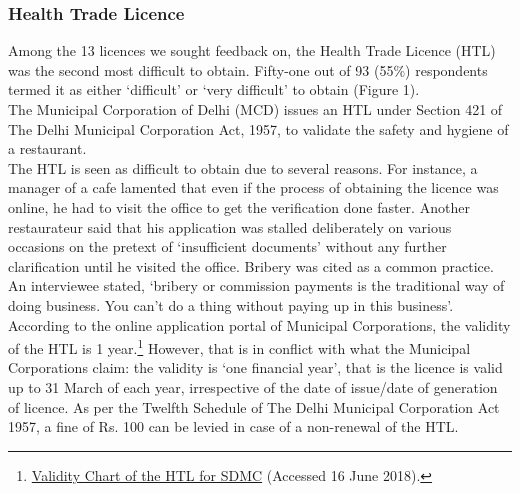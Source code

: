\documentclass[a4paper, 12pt]{article}
\begin{document}
                          
                                         
                    \subsubsection{Health Trade Licence}
                    Among the 13 licences we sought feedback on, the Health Trade Licence (HTL) was the second most difficult to obtain. Fifty-one out of 93 (55\%) respondents termed it as either ‘difficult’ or ‘very difficult’ to obtain (Figure 1). \\
                    The Municipal Corporation of Delhi (MCD) issues an HTL under Section 421 of The Delhi Municipal Corporation Act, 1957, to validate the safety and hygiene of a restaurant.\\
                    The HTL is seen as difficult to obtain due to several reasons. For instance, a manager of a cafe lamented that even if the process of obtaining the licence was online, he had to visit the office to get the verification done faster. Another restaurateur said that his application was stalled deliberately on various occasions on the pretext of ‘insufficient documents’ without any further clarification until he visited the office. Bribery was cited as a common practice. An interviewee stated, ‘bribery or commission payments is the traditional way of doing business. You can’t do a thing without paying up in this business’.\\
                    According to the online application portal of Municipal Corporations, the validity of the HTL is 1 year.\footnote{\href{https://bit.ly/2Qzd92r}{Validity Chart of the HTL for SDMC} (Accessed 16 June 2018).}  %
                    However, that is in conflict with what the Municipal Corporations claim: the validity is ‘one financial year’, that is the licence is valid up to 31 March of each year, irrespective of the date of issue/date of generation of licence. As per the Twelfth Schedule of The Delhi Municipal Corporation Act 1957, a fine of Rs. 100 can be levied in case of a non-renewal of the HTL. %
  
     
\end{document}
